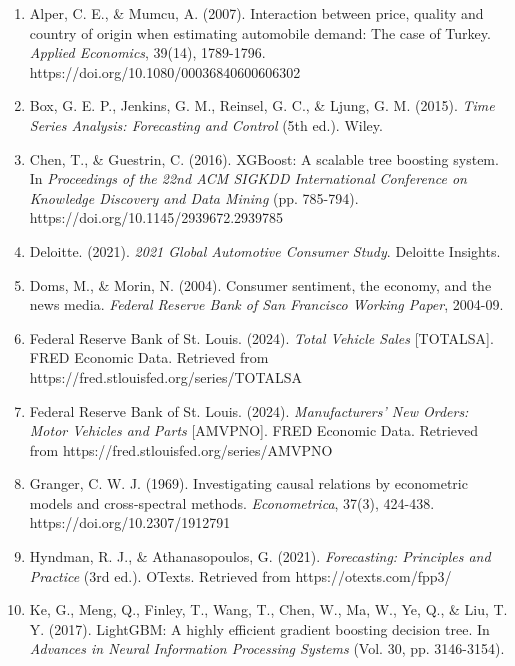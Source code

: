 \documentclass[12pt]{article}
\begin{document}
\begin{enumerate}
    \item Alper, C. E., \& Mumcu, A. (2007). Interaction between price, quality and country of origin when estimating automobile demand: The case of Turkey. \textit{Applied Economics}, 39(14), 1789-1796. https://doi.org/10.1080/00036840600606302

    \item Box, G. E. P., Jenkins, G. M., Reinsel, G. C., \& Ljung, G. M. (2015). \textit{Time Series Analysis: Forecasting and Control} (5th ed.). Wiley.

    \item Chen, T., \& Guestrin, C. (2016). XGBoost: A scalable tree boosting system. In \textit{Proceedings of the 22nd ACM SIGKDD International Conference on Knowledge Discovery and Data Mining} (pp. 785-794). https://doi.org/10.1145/2939672.2939785

    \item Deloitte. (2021). \textit{2021 Global Automotive Consumer Study}. Deloitte Insights.

    \item Doms, M., \& Morin, N. (2004). Consumer sentiment, the economy, and the news media. \textit{Federal Reserve Bank of San Francisco Working Paper}, 2004-09.

    \item Federal Reserve Bank of St. Louis. (2024). \textit{Total Vehicle Sales} [TOTALSA]. FRED Economic Data. Retrieved from https://fred.stlouisfed.org/series/TOTALSA

    \item Federal Reserve Bank of St. Louis. (2024). \textit{Manufacturers' New Orders: Motor Vehicles and Parts} [AMVPNO]. FRED Economic Data. Retrieved from https://fred.stlouisfed.org/series/AMVPNO

    \item Granger, C. W. J. (1969). Investigating causal relations by econometric models and cross-spectral methods. \textit{Econometrica}, 37(3), 424-438. https://doi.org/10.2307/1912791

    \item Hyndman, R. J., \& Athanasopoulos, G. (2021). \textit{Forecasting: Principles and Practice} (3rd ed.). OTexts. Retrieved from https://otexts.com/fpp3/

    \item Ke, G., Meng, Q., Finley, T., Wang, T., Chen, W., Ma, W., Ye, Q., \& Liu, T. Y. (2017). LightGBM: A highly efficient gradient boosting decision tree. In \textit{Advances in Neural Information Processing Systems} (Vol. 30, pp. 3146-3154).


\end{enumerate}
\end{document}
